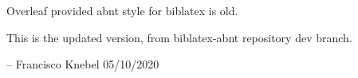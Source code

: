 Overleaf provided abnt style for biblatex is old.

This is the updated version, from biblatex-abnt repository dev branch.

-- 
Francisco Knebel
05/10/2020
